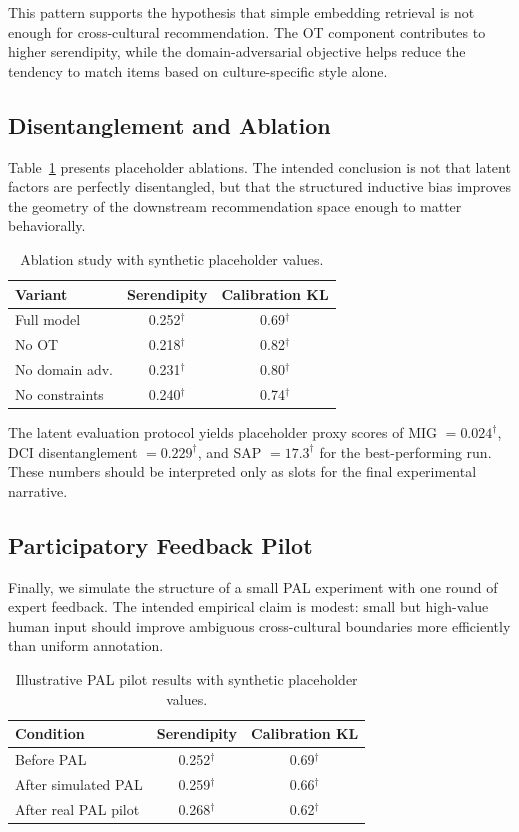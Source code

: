 \documentclass[10pt,twocolumn]{article}
\begin{document}
This pattern supports the hypothesis that simple embedding retrieval is not enough for cross-cultural recommendation.
The OT component contributes to higher serendipity, while the domain-adversarial objective helps reduce the tendency to match items based on culture-specific style alone.

\subsection{Disentanglement and Ablation}
Table~\ref{tab:ablation} presents placeholder ablations.
The intended conclusion is not that latent factors are perfectly disentangled, but that the structured inductive bias improves the geometry of the downstream recommendation space enough to matter behaviorally.

\begin{table}[t]
\centering
\caption{Ablation study with synthetic placeholder values.}
\label{tab:ablation}
\begin{tabular}{lcc}
\toprule
Variant & Serendipity & Calibration KL \\
\midrule
Full model & 0.252$^\dagger$ & 0.69$^\dagger$ \\
No OT & 0.218$^\dagger$ & 0.82$^\dagger$ \\
No domain adv. & 0.231$^\dagger$ & 0.80$^\dagger$ \\
No constraints & 0.240$^\dagger$ & 0.74$^\dagger$ \\
\bottomrule
\end{tabular}
\end{table}

The latent evaluation protocol yields placeholder proxy scores of MIG $=0.024^\dagger$, DCI disentanglement $=0.229^\dagger$, and SAP $=17.3^\dagger$ for the best-performing run.
These numbers should be interpreted only as slots for the final experimental narrative.

\subsection{Participatory Feedback Pilot}
Finally, we simulate the structure of a small PAL experiment with one round of expert feedback.
The intended empirical claim is modest:
small but high-value human input should improve ambiguous cross-cultural boundaries more efficiently than uniform annotation.

\begin{table}[t]
\centering
\caption{Illustrative PAL pilot results with synthetic placeholder values.}
\label{tab:pal}
\begin{tabular}{lcc}
\toprule
Condition & Serendipity & Calibration KL \\
\midrule
Before PAL & 0.252$^\dagger$ & 0.69$^\dagger$ \\
After simulated PAL & 0.259$^\dagger$ & 0.66$^\dagger$ \\
After real PAL pilot & 0.268$^\dagger$ & 0.62$^\dagger$ \\
\bottomrule
\end{tabular}
\end{table}
\end{document}
